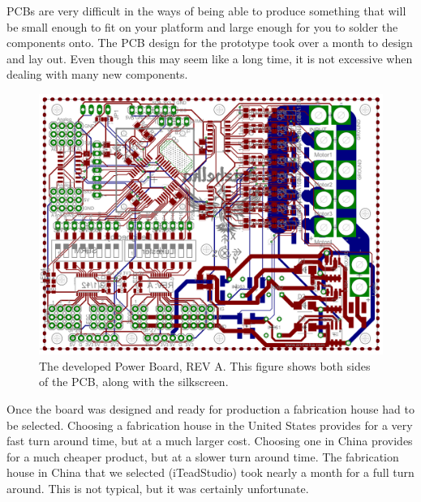 \documentclass{article}
\numberwithin{equation}{section} %
\begin{document}
PCBs are very difficult in the ways of being able to produce something that will be small enough to fit on your platform and large enough for you to solder the components onto. The PCB design for the prototype took over a month to design and lay out. Even though this may seem like a long time, it is not excessive when dealing with many new components.
\begin{figure}[h!]
  \centering
	\includegraphics[scale=.23]{revA_both.png}
  \caption{The developed Power Board, REV A. This figure shows both sides of the PCB, along with the silkscreen.}
\end{figure}  
Once the board was designed and ready for production a fabrication house had to be selected. Choosing a fabrication house in the United States provides for a very fast turn around time, but at a much larger cost. Choosing one in China provides for a much cheaper product, but at a slower turn around time. The fabrication house in China that we selected (iTeadStudio) took nearly a month for a full turn around. This is not typical, but it was certainly unfortunate.
\end{document}
